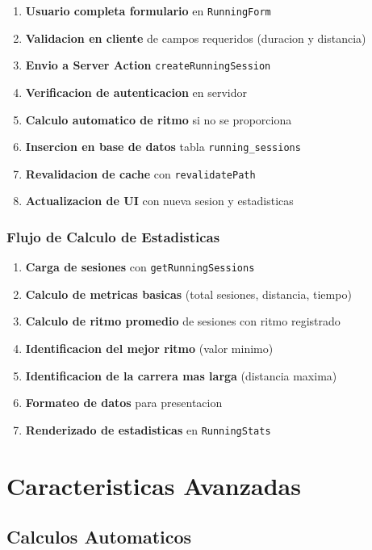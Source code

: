 \documentclass[12pt,a4paper]{article}
\begin{document}
\begin{enumerate}
    \item \textbf{Usuario completa formulario} en \texttt{RunningForm}
    \item \textbf{Validacion en cliente} de campos requeridos (duracion y distancia)
    \item \textbf{Envio a Server Action} \texttt{createRunningSession}
    \item \textbf{Verificacion de autenticacion} en servidor
    \item \textbf{Calculo automatico de ritmo} si no se proporciona
    \item \textbf{Insercion en base de datos} tabla \texttt{running\_sessions}
    \item \textbf{Revalidacion de cache} con \texttt{revalidatePath}
    \item \textbf{Actualizacion de UI} con nueva sesion y estadisticas
\end{enumerate}

\subsubsection{Flujo de Calculo de Estadisticas}

\begin{enumerate}
    \item \textbf{Carga de sesiones} con \texttt{getRunningSessions}
    \item \textbf{Calculo de metricas basicas} (total sesiones, distancia, tiempo)
    \item \textbf{Calculo de ritmo promedio} de sesiones con ritmo registrado
    \item \textbf{Identificacion del mejor ritmo} (valor minimo)
    \item \textbf{Identificacion de la carrera mas larga} (distancia maxima)
    \item \textbf{Formateo de datos} para presentacion
    \item \textbf{Renderizado de estadisticas} en \texttt{RunningStats}
\end{enumerate}

\section{Caracteristicas Avanzadas}

\subsection{Calculos Automaticos}
\end{document}
